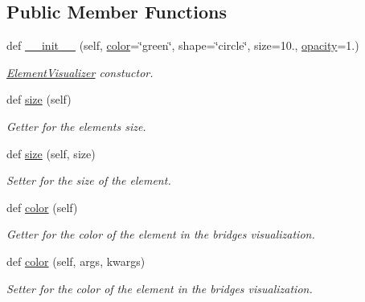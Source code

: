 \subsection*{Public Member Functions}
\begin{DoxyCompactItemize}
\item 
def \mbox{\hyperlink{classbridges_1_1element__visualizer_1_1_element_visualizer_a27ee5eddf78bac93e2702b2f2203518a}{\+\_\+\+\_\+init\+\_\+\+\_\+}} (self, \mbox{\hyperlink{classbridges_1_1element__visualizer_1_1_element_visualizer_a1fd985698e1c56289ed49fa7849d43ab}{color}}=\char`\"{}green\char`\"{}, shape=\char`\"{}circle\char`\"{}, size=10., \mbox{\hyperlink{classbridges_1_1element__visualizer_1_1_element_visualizer_a64288f56aa9cb5f3ccf703d696df1c04}{opacity}}=1.)
\begin{DoxyCompactList}\small\item\em \mbox{\hyperlink{classbridges_1_1element__visualizer_1_1_element_visualizer}{Element\+Visualizer}} constuctor. \end{DoxyCompactList}\item 
def \mbox{\hyperlink{classbridges_1_1element__visualizer_1_1_element_visualizer_ad3a1c448194330f7122c31f68ed44d49}{size}} (self)
\begin{DoxyCompactList}\small\item\em Getter for the elements size. \end{DoxyCompactList}\item 
def \mbox{\hyperlink{classbridges_1_1element__visualizer_1_1_element_visualizer_adee6d74f47355b75634a9fd5d0ae1714}{size}} (self, size)
\begin{DoxyCompactList}\small\item\em Setter for the size of the element. \end{DoxyCompactList}\item 
def \mbox{\hyperlink{classbridges_1_1element__visualizer_1_1_element_visualizer_acb214c900f5e13f694aa04f284ec55e2}{color}} (self)
\begin{DoxyCompactList}\small\item\em Getter for the color of the element in the bridges visualization. \end{DoxyCompactList}\item 
def \mbox{\hyperlink{classbridges_1_1element__visualizer_1_1_element_visualizer_a8579ca1bda361a0ba44efda8683480bd}{color}} (self, args, kwargs)
\begin{DoxyCompactList}\small\item\em Setter for the color of the element in the bridges visualization. \end{DoxyCompactList}\item 

\end{DoxyCompactItemize}
